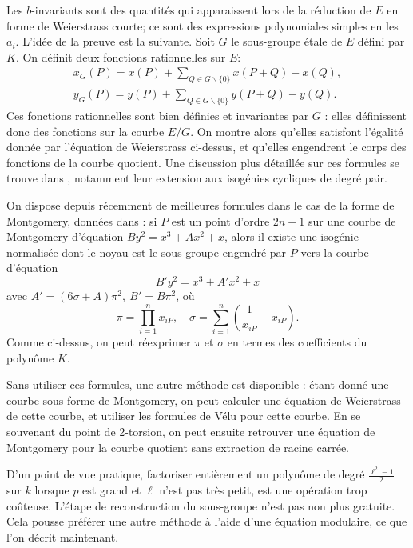 \documentclass[11pt,a4paper]{article}
\renewcommand{\v}{\vspace{5mm}}
\theoremstyle{definition}
\begin{document}
Les $b$-invariants sont des quantités qui apparaissent lors de la réduction de $E$ en forme de Weierstrass courte; ce sont des expressions polynomiales simples en les $a_i$. L'idée de la preuve est la suivante.
Soit $G$ le sous-groupe étale de $E$ défini par $K$. On définit deux fonctions rationnelles sur $E$:
$$\begin{aligned}
x_G(P) = x(P) + \sum_{Q\in G\backslash \{0\}} x(P+Q) - x(Q),\\
y_G(P) = y(P) + \sum_{Q\in G\backslash \{0\}} y(P+Q) - y(Q).
\end{aligned}$$
Ces fonctions rationnelles sont bien définies et invariantes par $G$ : elles définissent donc des fonctions sur la courbe $E/G$. On montre alors qu'elles satisfont l'égalité donnée par l'équation de Weierstrass ci-dessus, et qu'elles engendrent le corps des fonctions de la courbe quotient.
Une discussion plus détaillée sur ces formules se trouve dans \cite{Kohel}, notamment leur extension aux isogénies cycliques de degré pair.

\v
On dispose depuis récemment de meilleures formules dans le cas de la forme de Montgomery, données dans \cite{VeluMontgomery}: si $P$ est un point d'ordre $2n+1$ sur une courbe de Montgomery d'équation $By^2 = x^3 + Ax^2 + x$, alors il existe une isogénie normalisée dont le noyau est le sous-groupe engendré par $P$ vers la courbe d'équation
$$B'y^2 = x^3 + A'x^2 + x$$
avec $A' = (6\sigma + A)\pi^2,\ B' = B\pi^2$, où
$$
\pi = \prod_{i = 1}^n x_{iP}, \quad
\sigma = \sum_{i = 1}^n \left(\frac{1}{x_{iP}} - x_{iP}\right).
$$
Comme ci-dessus, on peut réexprimer $\pi$ et $\sigma$ en termes des coefficients du polynôme $K$.

Sans utiliser ces formules, une autre méthode est disponible : étant donné une courbe sous forme de Montgomery, on peut calculer une équation de Weierstrass de cette courbe, et utiliser les formules de Vélu pour cette courbe. En se souvenant du point de 2-torsion, on peut ensuite retrouver une équation de Montgomery pour la courbe quotient sans extraction de racine carrée.

\v
D'un point de vue pratique, factoriser entièrement un polynôme de degré $\frac{\ell^2 - 1}{2}$ sur $k$ lorsque $p$ est grand et $\ell$ n'est pas très petit, est une opération trop coûteuse. L'étape de reconstruction du sous-groupe n'est pas non plus gratuite.%
Cela pousse préférer une autre méthode à l'aide d'une équation modulaire, ce que l'on décrit maintenant.
\end{document}
